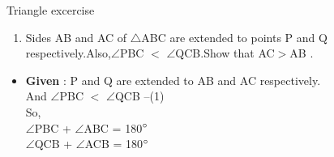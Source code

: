\begin{frame}{Triangle excercise}
\begin{enumerate}
\item Sides AB and AC of $\triangle$ABC are extended to points P and Q respectively.Also,$\angle$PBC $<$ $\angle$QCB.Show that AC$>$AB .
\begin{figure}

\end{figure}
\end{enumerate}
\begin{itemize}

\item \textbf{Given} : P and Q are extended to AB and AC respectively.\\
And $\angle$PBC $<$ $\angle$QCB --(1)\\
So,\\
\seti
$\angle$PBC + $\angle$ABC = 180$\degree$  \\
$\angle$QCB + $\angle$ACB = 180$\degree$  \\
\end{itemize}
\end{frame}
